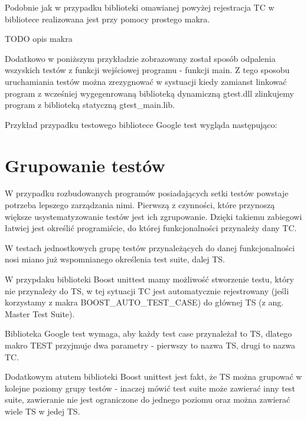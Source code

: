 \documentclass[12pt,a4paper,notitlepage]{report}
\begin{document}
Podobnie jak w przypadku biblioteki omawianej powyżej rejestracja TC w bibliotece realizowana jest przy pomocy prostego makra. 

TODO opis makra

Dodatkowo w poniższym przykładzie zobrazowany został sposób odpalenia wszyskich testów z funkcji wejściowej programu - funkcji main. Z tego sposobu uruchamiania testów można zrezygnować w systuacji kiedy zamianst linkować program z wcześniej wygegenrowaną biblioteką dynamiczną gtest.dll zlinkujemy program z biblioteką statyczną gtest{\_}main.lib.

Przykład przypadku testowego bibliotece Google test wygląda następująco:

			

\chapter{Grupowanie testów}

W przypadku rozbudowanych programów posiadających setki testów powstaje potrzeba lepszego zarządzania nimi. Pierwszą z czynności, które przynoszą większe usystematyzowanie testów jest ich zgrupowanie. Dzięki takiemu zabiegowi łatwiej jest określić programiście, do której funkcjonalności przynależy dany TC.

W testach jednostkowych grupę testów przynależących do danej funkcjonalności nosi miano już wspomnianego określenia test suite, dalej TS. 

W przypdaku biblioteki Boost unittest mamy możliwość stworzenie testu, który nie przynależy do TS, w tej sytuacji TC jest automatycznie rejestrowany (jeśli korzystamy z makra BOOST{\_}AUTO{\_}TEST{\_}CASE) do głównej TS (z ang. Master Test Suite).

Biblioteka Google test wymaga, aby każdy test case przynależał to TS, dlatego makro TEST przyjmuje dwa parametry - pierwszy to nazwa TS, drugi to nazwa TC.

Dodatkowym atutem biblioteki Boost unittest jest fakt, że TS można grupować w kolejne poziomy grupy testów - inaczej mówić test suite może zawierać inny test suite, zawieranie nie jest ograniczone do jednego poziomu oraz można zawierać wiele TS w jedej TS.
\end{document}
